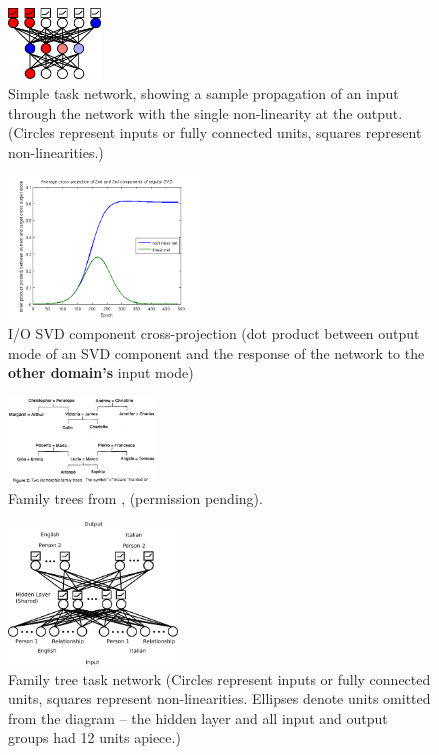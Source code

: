 \documentclass[10pt,letterpaper]{article}
\begin{document}
\begin{figure}[H]
\centering
\includegraphics[width=0.22\textwidth]{figures/network_diagram.png}
\caption{Simple task network, showing a sample propagation of an input through the network with the single non-linearity at the output. (Circles represent inputs or fully connected units, squares represent non-linearities.) }
\label{network_diagram}
\end{figure}
\begin{figure}[H]
\centering
\includegraphics[width=0.45\textwidth]{figures/SVD_cross_projection_learning.png}
\caption{I/O SVD component cross-projection (dot product between output mode of an SVD component and the response of the network to the \textbf{other domain's} input mode)}
\label{SVD_cross_projection_learning}
\end{figure}
\begin{figure}[H]
\centering
\includegraphics[width=0.35\textwidth]{figures/hinton_family_tree_figure.png}
\caption{Family trees from \citet{Hinton1986}, (permission pending).}
\label{hinton_family_tree_figure}
\end{figure}
\begin{figure}[H]
\centering
\includegraphics[width=0.4\textwidth]{figures/family_tree_network_diagram.png}
\caption{Family tree task network (Circles represent inputs or fully connected units, squares represent non-linearities. Ellipses denote units omitted from the diagram -- the hidden layer and all input and output groups had 12 units apiece.)}
\label{family_tree_network_diagram}
\end{figure}
\end{document}
